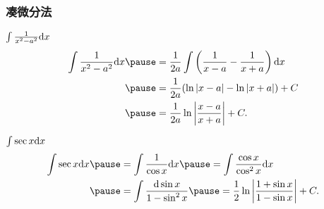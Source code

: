 \documentclass[
10pt,
aspectratio=43,
]{beamer}
\begin{document}
\begin{frame}
	\frametitle{凑微分法}
	\everymath{\displaystyle}
	\begin{exampleblock}{$\color{black}\int \frac{1}{x^2-a^2} \mathrm{d}x$}
		$$
			\begin{aligned}
				\int \frac{1}{x^2-a^2} \mathrm{d}x & \pause  = \frac{1}{2a} \int \left(\frac{1}{x-a}-\frac{1}{x+a}\right) \mathrm{d}x \\
				                                   & \pause = \frac{1}{2a}(\ln |x-a|-\ln |x+a|)+C                                     \\
				                                   & \pause  = \frac{1}{2a} \ln \left|\frac{x-a}{x+a}\right|+C.
			\end{aligned}
		$$
	\end{exampleblock}
	\pause
	\begin{exampleblock}{$\color{black}\int \sec x \mathrm{d}x$}
		$$
			\begin{aligned}
				\int \sec x \mathrm{d}x & \pause  = \int \frac{1}{\cos x} \mathrm{d}x \pause  = \int \frac{\cos x}{\cos^2 x} \mathrm{d}x                        \\
				                        & \pause = \int \frac{\mathrm{d}\sin x}{1-\sin^2 x} \pause  = \frac{1}{2} \ln \left|\frac{1+\sin x}{1-\sin x}\right|+C.
			\end{aligned}
		$$
	\end{exampleblock}
\end{frame}
\end{document}
